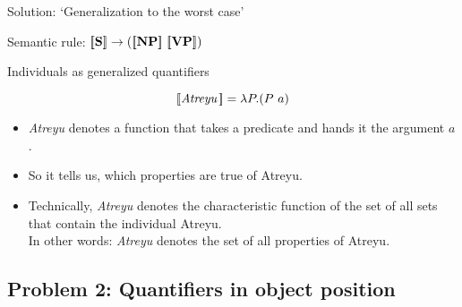 \documentclass[xcolor=dvipsnames]{beamer}
\newcommand{\sem}[1]{\ensuremath{[\hspace{-1.8pt}[ #1 ]\hspace{-1.8pt}]}}
\begin{document}
\begin{frame}{Solution: `Generalization to the worst case'}


\begin{center}
Semantic rule: {$\sem{\mathbf{S}} \to (\sem{\mathbf{NP}}\ \sem{\mathbf{VP}})$}
\end{center}
\end{frame}

\begin{frame}{Individuals as generalized quantifiers}

$$\sem{\text{\em Atreyu}\,} = \lambda P.(P\ a)$$

\begin{itemize}
\item {\em Atreyu} denotes a function that takes a predicate and hands it the argument $a$. 
\item So it tells us, which properties are true of Atreyu.
\item Technically, {\em Atreyu} denotes the characteristic function of the set of all 
 sets that contain the individual Atreyu.\\
 In other words: {\em Atreyu} denotes the set of all properties of Atreyu.
\end{itemize}
\end{frame}


\subsection*{Problem 2: Quantifiers in object position}
\end{document}
